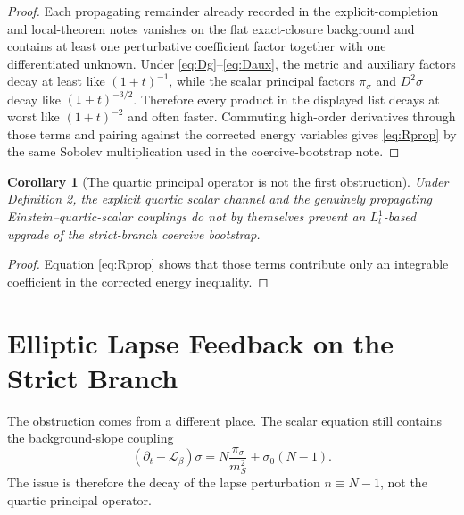 \documentclass[11pt]{article}
\newcommand{\Ell}{\mathcal{L}}
\newtheorem{corollary}{Corollary}
\begin{document}
\begin{proof}
Each propagating remainder already recorded in the explicit-completion and local-theorem notes vanishes on the flat exact-closure background and contains at least one perturbative coefficient factor together with one differentiated unknown. Under \eqref{eq:Dg}--\eqref{eq:Daux}, the metric and auxiliary factors decay at least like \((1+t)^{-1}\), while the scalar principal factors \(\pi_\sigma\) and \(D^2\sigma\) decay like \((1+t)^{-3/2}\). Therefore every product in the displayed list decays at worst like \((1+t)^{-2}\) and often faster. Commuting high-order derivatives through those terms and pairing against the corrected energy variables gives \eqref{eq:Rprop} by the same Sobolev multiplication used in the coercive-bootstrap note.
\end{proof}

\begin{corollary}[The quartic principal operator is not the first obstruction]
Under Definition 2, the explicit quartic scalar channel and the genuinely propagating Einstein--quartic-scalar couplings do not by themselves prevent an \(L_t^1\)-based upgrade of the strict-branch coercive bootstrap.
\end{corollary}

\begin{proof}
Equation \eqref{eq:Rprop} shows that those terms contribute only an integrable coefficient in the corrected energy inequality.
\end{proof}

\section{Elliptic Lapse Feedback on the Strict Branch}

The obstruction comes from a different place. The scalar equation still contains the background-slope coupling
\begin{equation}
(\partial_t-\Ell_\beta)\sigma
=
N\frac{\pi_\sigma}{m_S^2}
+ \sigma_0(N-1).
\label{eq:sigmadt}
\end{equation}
The issue is therefore the decay of the lapse perturbation \(n\equiv N-1\), not the quartic principal operator.
\end{document}
